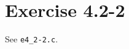 \documentclass{article}
\begin{document}
\section*{Exercise 4.2-2}

See \texttt{e4\_2-2.c}.
\end{document}
